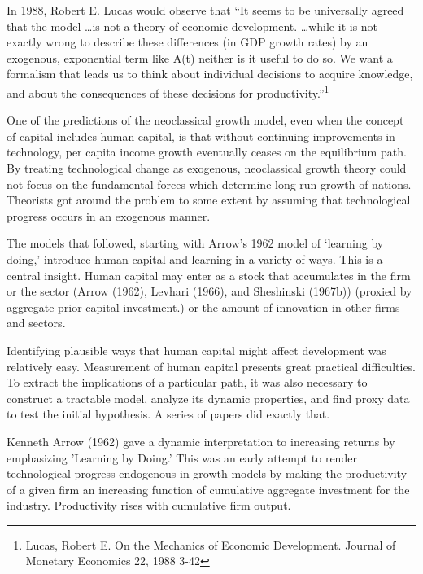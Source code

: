 In 1988, Robert E. Lucas would observe that ``It seems to be universally agreed that the model \dots is not a theory of economic development.   \dots while it is not exactly wrong to describe these differences (in GDP  growth rates) by an exogenous, exponential term like A(t) neither is it useful to do so. We want a formalism that leads us to think about individual decisions to acquire knowledge, and about the consequences of these decisions for productivity.''\footnote{Lucas,  Robert E. On the Mechanics of Economic Development. Journal of Monetary Economics 22, 1988 3-42} 


One of the predictions of the neoclassical growth model, even  when the concept of capital includes human capital, is that without  continuing improvements in technology, per capita income growth eventually ceases on the equilibrium path. 
By treating technological change as exogenous, neoclassical growth theory could not focus on the fundamental forces which determine long-run growth of nations. Theorists got around the problem to some extent by assuming that technological progress occurs in an exogenous manner. 

The models that followed, starting with Arrow's 1962 model of `learning by doing,' introduce human capital and learning in a variety of ways. This is a central insight. Human capital may enter  as a stock that accumulates in the firm or the sector (Arrow (1962), Levhari (1966), and Sheshinski (1967b)) (proxied by aggregate prior capital investment.)
or the amount of innovation in other firms and sectors. %

Identifying  plausible ways that human capital might affect development was relatively easy. Measurement of human capital presents great practical difficulties. To extract the implications of a particular path, it was also necessary to construct a tractable model, analyze its dynamic properties, and find proxy data to test the initial hypothesis.   A series of papers did exactly that.

Kenneth Arrow (1962) gave a dynamic interpretation to increasing returns by emphasizing 'Learning by Doing.' This was an early attempt to render technological progress endogenous in growth models by making the productivity of a given firm an increasing function of cumulative aggregate investment for the industry. Productivity rises with cumulative firm output.

